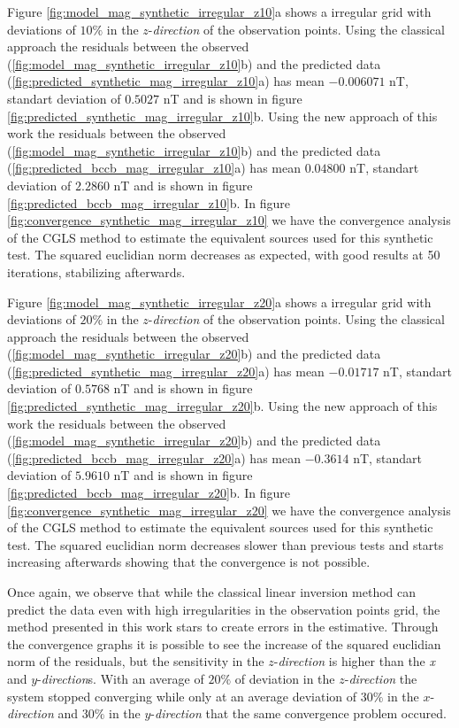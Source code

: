Figure \ref{fig:model_mag_synthetic_irregular_z10}a shows a irregular grid with deviations of $10\%$ in the $z$-\textit{direction} of the observation points. Using the classical approach the residuals between the observed (\ref{fig:model_mag_synthetic_irregular_z10}b) and the predicted data (\ref{fig:predicted_synthetic_mag_irregular_z10}a) has mean $-0.006071$ nT, standart deviation of $0.5027$ nT and is shown in figure \ref{fig:predicted_synthetic_mag_irregular_z10}b. Using the new approach of this work the residuals between the observed (\ref{fig:model_mag_synthetic_irregular_z10}b) and the predicted data (\ref{fig:predicted_bccb_mag_irregular_z10}a) has mean $0.04800$ nT, standart deviation of $2.2860$ nT and is shown in figure \ref{fig:predicted_bccb_mag_irregular_z10}b.
In figure \ref{fig:convergence_synthetic_mag_irregular_z10} we have the convergence analysis of the CGLS method to estimate the equivalent sources used for this synthetic test. The squared euclidian norm decreases as expected, with good results at 50 iterations, stabilizing afterwards.

Figure \ref{fig:model_mag_synthetic_irregular_z20}a shows a irregular grid with deviations of $20\%$ in the $z$-\textit{direction} of the observation points. Using the classical approach the residuals between the observed (\ref{fig:model_mag_synthetic_irregular_z20}b) and the predicted data (\ref{fig:predicted_synthetic_mag_irregular_z20}a) has mean $-0.01717$ nT, standart deviation of $0.5768$ nT and is shown in figure \ref{fig:predicted_synthetic_mag_irregular_z20}b. Using the new approach of this work the residuals between the observed (\ref{fig:model_mag_synthetic_irregular_z20}b) and the predicted data (\ref{fig:predicted_bccb_mag_irregular_z20}a) has mean $-0.3614$ nT, standart deviation of $5.9610$ nT and is shown in figure \ref{fig:predicted_bccb_mag_irregular_z20}b.
In figure \ref{fig:convergence_synthetic_mag_irregular_z20} we have the convergence analysis of the CGLS method to estimate the equivalent sources used for this synthetic test. The squared euclidian norm decreases slower than previous tests and starts increasing afterwards showing that the convergence is not possible.

Once again, we observe that while the classical linear inversion method can predict the data even with high irregularities in the observation points grid, the method presented in this work stars to create errors in the estimative. Through the convergence graphs it is possible to see the increase of the squared euclidian norm of the residuals, but the sensitivity in the $z$-\textit{direction} is higher than the \emph{x} and $y$-\textit{direction}s. With an average of $20\%$ of deviation in the $z$-\textit{direction} the system stopped converging while only at an average deviation of $30\%$ in the $x$-\textit{direction} and $30\%$ in the $y$-\textit{direction} that the same convergence problem occured.